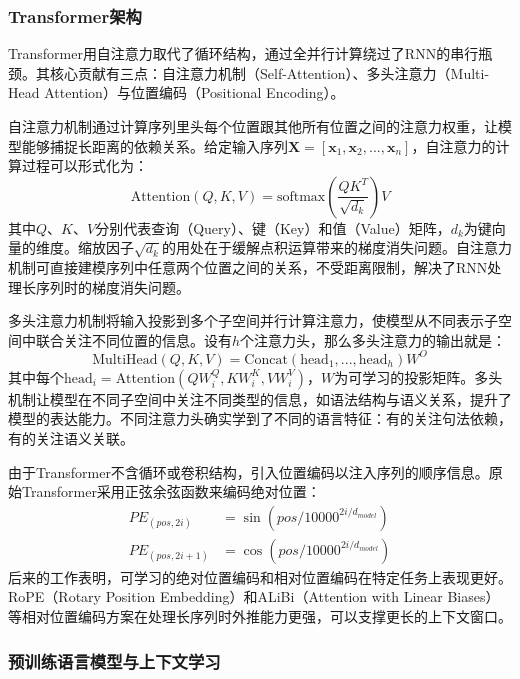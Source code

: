 \subsubsection{Transformer架构}

Transformer\cite{vaswani2017attention}用自注意力取代了循环结构，通过全并行计算绕过了RNN的串行瓶颈。其核心贡献有三点：自注意力机制（Self-Attention）、多头注意力（Multi-Head Attention）与位置编码（Positional Encoding）。

自注意力机制通过计算序列里头每个位置跟其他所有位置之间的注意力权重，让模型能够捕捉长距离的依赖关系。给定输入序列$\mathbf{X} = [\mathbf{x}_1, \mathbf{x}_2, ..., \mathbf{x}_n]$，自注意力的计算过程可以形式化为：
\begin{equation}
\text{Attention}(Q, K, V) = \text{softmax}\left(\frac{QK^T}{\sqrt{d_k}}\right)V
\end{equation}
其中$Q$、$K$、$V$分别代表查询（Query）、键（Key）和值（Value）矩阵，$d_k$为键向量的维度。缩放因子$\sqrt{d_k}$的用处在于缓解点积运算带来的梯度消失问题。自注意力机制可直接建模序列中任意两个位置之间的关系，不受距离限制，解决了RNN处理长序列时的梯度消失问题。

多头注意力机制将输入投影到多个子空间并行计算注意力，使模型从不同表示子空间中联合关注不同位置的信息。设有$h$个注意力头，那么多头注意力的输出就是：
\begin{equation}
\text{MultiHead}(Q, K, V) = \text{Concat}(\text{head}_1, ..., \text{head}_h)W^O
\end{equation}
其中每个$\text{head}_i = \text{Attention}(QW_i^Q, KW_i^K, VW_i^V)$，$W$为可学习的投影矩阵。多头机制让模型在不同子空间中关注不同类型的信息，如语法结构与语义关系，提升了模型的表达能力。不同注意力头确实学到了不同的语言特征：有的关注句法依赖，有的关注语义关联。

由于Transformer不含循环或卷积结构，引入位置编码以注入序列的顺序信息。原始Transformer采用正弦余弦函数来编码绝对位置：
\begin{align}
PE_{(pos, 2i)} &= \sin(pos/10000^{2i/d_{model}}) \\
PE_{(pos, 2i+1)} &= \cos(pos/10000^{2i/d_{model}})
\end{align}
后来的工作表明，可学习的绝对位置编码和相对位置编码在特定任务上表现更好。RoPE（Rotary Position Embedding）和ALiBi（Attention with Linear Biases）等相对位置编码方案在处理长序列时外推能力更强，可以支撑更长的上下文窗口。

\subsubsection{预训练语言模型与上下文学习}

